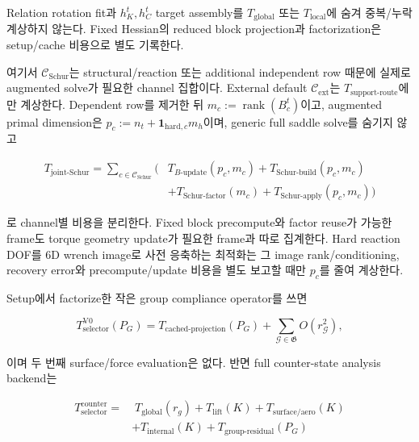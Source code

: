 \documentclass[11pt,a4paper]{article}
\begin{document}
Relation rotation fit과 \(h_K^t,h_C^t\) target assembly를
\(T_{\mathrm{global}}\) 또는 \(T_{\mathrm{local}}\)에 숨겨 중복/누락 계상하지 않는다.
Fixed Hessian의 reduced block projection과 factorization은 setup/cache 비용으로 별도 기록한다.

여기서 \(\mathcal C_{\mathrm{Schur}}\)는 structural/reaction 또는 additional independent row 때문에
실제로 augmented solve가 필요한 channel 집합이다. External default
\(\mathcal C_{\mathrm{ext}}\)는 \(T_{\mathrm{support\mbox{-}route}}\)에만 계상한다.
Dependent row를 제거한 뒤 \(m_c:=\operatorname{rank}(B_c^t)\)이고,
augmented primal dimension은
\(p_c:=n_t+\mathbf1_{\mathrm{hard},c}m_h\)이며,
generic full saddle solve를 숨기지 않고

\begin{equation}
\begin{aligned}
T_{\mathrm{joint\mbox{-}Schur}}
=\sum_{c\in\mathcal C_{\mathrm{Schur}}}
\bigl(&T_{B\mathrm{\mbox{-}update}}(p_c,m_c)
+T_{\mathrm{Schur\mbox{-}build}}(p_c,m_c)\\
&+T_{\mathrm{Schur\mbox{-}factor}}(m_c)
+T_{\mathrm{Schur\mbox{-}apply}}(p_c,m_c)\bigr)
\end{aligned}
\end{equation}

로 channel별 비용을 분리한다. Fixed block precompute와 factor reuse가 가능한 frame도
torque geometry update가 필요한 frame과 따로 집계한다.
Hard reaction DOF를 6D wrench image로 사전 응축하는 최적화는 그 image rank/conditioning,
recovery error와 precompute/update 비용을 별도 보고할 때만 \(p_c\)를 줄여 계상한다.

Setup에서 factorize한 작은 group compliance operator를 쓰면

\begin{equation}
  T_{\mathrm{selector}}^{\mathrm{V0}}(P_G)
  =T_{\mathrm{cached\mbox{-}projection}}(P_G)
  +\sum_{\mathcal G\in\mathfrak G}O(r_{\mathcal G}^2),
\end{equation}

이며 두 번째 surface/force evaluation은 없다. 반면 full counter-state analysis backend는

\begin{equation}
\begin{aligned}
  T_{\mathrm{selector}}^{\mathrm{counter}}
  =&\;T_{\mathrm{global}}(r_g)+T_{\mathrm{lift}}(K)
  +T_{\mathrm{surface/aero}}(K)\\
  &+T_{\mathrm{internal}}(K)+T_{\mathrm{group\mbox{-}residual}}(P_G)
\end{aligned}
\end{equation}
\end{document}
